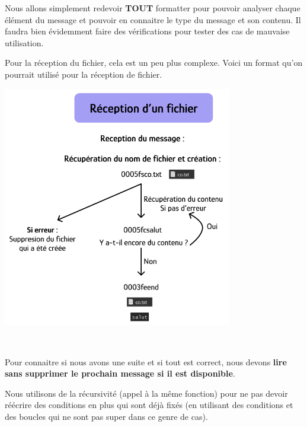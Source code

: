Nous allons simplement redevoir \textbf{TOUT} formatter pour pouvoir analyser chaque élément du message et pouvoir en connaitre le type du message et son contenu. Il faudra bien évidemment faire des vérifications pour tester des cas de mauvaise utilisation. \\ \par

Pour la réception du fichier, cela est un peu plus complexe. Voici un format qu'on pourrait utilisé pour la réception de fichier.

    {
    \centering
    \includegraphics[width=10cm]{figures/reception_fichier.png}
    \par
    } \hfill \\ \par

Pour connaitre si nous avons une suite et si tout est correct, nous devons \textbf{lire sans supprimer le prochain message si il est disponible}.

Nous utilisons de la récursivité (appel à la même fonction) pour ne pas devoir réécrire des conditions en plus qui sont déjà fixés (en utilisant des conditions et des boucles qui ne sont pas super dans ce genre de cas).
